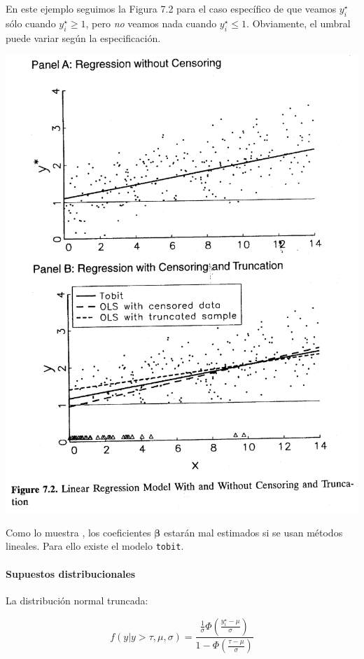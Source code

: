 \documentclass[onesided]{article}\usepackage[]{graphicx}\usepackage[]{color}
\makeatletter
\def\maxwidth{ %
  \ifdim\Gin@nat@width>\linewidth
    \linewidth
  \else
    \Gin@nat@width
  \fi
}
\makeatother
\begin{document}
En este ejemplo seguimos la Figura 7.2 para el caso espec\'ifico de que veamos $y_{i}^{\star}$ s\'olo cuando $y_{i}^{\star}\geq1$, pero \emph{no} veamos nada cuando $y_{i}^{\star}\leq1$. Obviamente, el umbral puede variar seg\'un la especificaci\'on.

{\centering \includegraphics[width=\maxwidth]{fig_7_2.png}}


Como lo muestra \textcite[189]{Long1997}, los coeficientes $\boldsymbol{\beta}$ estar\'an mal estimados si se usan m\'etodos lineales. Para ello existe el modelo \texttt{tobit}.

\paragraph{Supuestos distribucionales} 

La distribuci\'on normal truncada:

\begin{equation}\label{censored:2}
f(y| y > \tau, \mu, \sigma) = \frac{\frac{1}{\sigma}\Phi(\frac{y_{i}^{\star}-\mu}{\sigma})}{1-\Phi(\frac{\tau-\mu}{\sigma})}
\end{equation}
\end{document}
